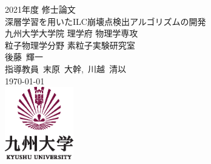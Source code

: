 \documentclass[12pt, openany]{jsbook}
\begin{document}
\begin{titlepage}
 \begin{center}
  {\Large 2021年度 修士論文} \\ 
  \vspace*{125pt}
  {\Large 深層学習を用いたILC崩壊点検出アルゴリズムの開発}\\[11pt]
  {\large 九州大学大学院 理学府 物理学専攻 \\ 粒子物理学分野 素粒子実験研究室} \\[15pt]
  \vspace{40pt}
  {\large  後藤\ 輝一 \\[1ex] 指導教員\ 末原\ 大幹,\ 川越\ 清以 } \\[1em]
  \today\\
 \vspace{100pt}
  \includegraphics[width=3cm]{Figure/1Introduction/KyushuUniversityLogo.eps}
 \end{center}
\end{titlepage}

\thispagestyle{empty}　\newpage

\thispagestyle{empty}　\newpage
\pagestyle{headings}
\tableofcontents
\listoffigures
\listoftables











\end{document}
